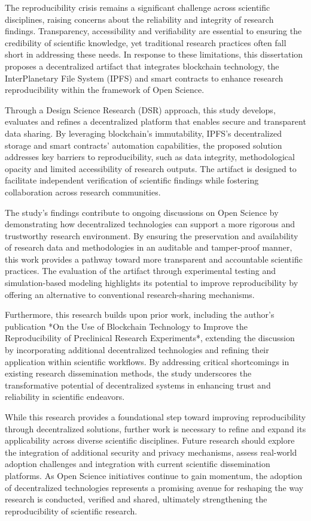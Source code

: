 \documentclass{article}
\begin{document}
The reproducibility crisis remains a significant challenge across scientific disciplines, raising concerns about the reliability and integrity of research findings. Transparency, accessibility and verifiability are essential to ensuring the credibility of scientific knowledge, yet traditional research practices often fall short in addressing these needs. In response to these limitations, this dissertation proposes a decentralized artifact that integrates blockchain technology, the InterPlanetary File System (IPFS) and smart contracts to enhance research reproducibility within the framework of Open Science.

Through a Design Science Research (DSR) approach, this study develops, evaluates and refines a decentralized platform that enables secure and transparent data sharing. By leveraging blockchain’s immutability, IPFS’s decentralized storage and smart contracts’ automation capabilities, the proposed solution addresses key barriers to reproducibility, such as data integrity, methodological opacity and limited accessibility of research outputs. The artifact is designed to facilitate independent verification of scientific findings while fostering collaboration across research communities.

The study’s findings contribute to ongoing discussions on Open Science by demonstrating how decentralized technologies can support a more rigorous and trustworthy research environment. By ensuring the preservation and availability of research data and methodologies in an auditable and tamper-proof manner, this work provides a pathway toward more transparent and accountable scientific practices. The evaluation of the artifact through experimental testing and simulation-based modeling highlights its potential to improve reproducibility by offering an alternative to conventional research-sharing mechanisms.

Furthermore, this research builds upon prior work, including the author’s publication *On the Use of Blockchain Technology to Improve the Reproducibility of Preclinical Research Experiments*, extending the discussion by incorporating additional decentralized technologies and refining their application within scientific workflows. By addressing critical shortcomings in existing research dissemination methods, the study underscores the transformative potential of decentralized systems in enhancing trust and reliability in scientific endeavors.

While this research provides a foundational step toward improving reproducibility through decentralized solutions, further work is necessary to refine and expand its applicability across diverse scientific disciplines. Future research should explore the integration of additional security and privacy mechanisms, assess real-world adoption challenges and integration with current scientific dissemination platforms. As Open Science initiatives continue to gain momentum, the adoption of decentralized technologies represents a promising avenue for reshaping the way research is conducted, verified and shared, ultimately strengthening the reproducibility of scientific research.
\end{document}

